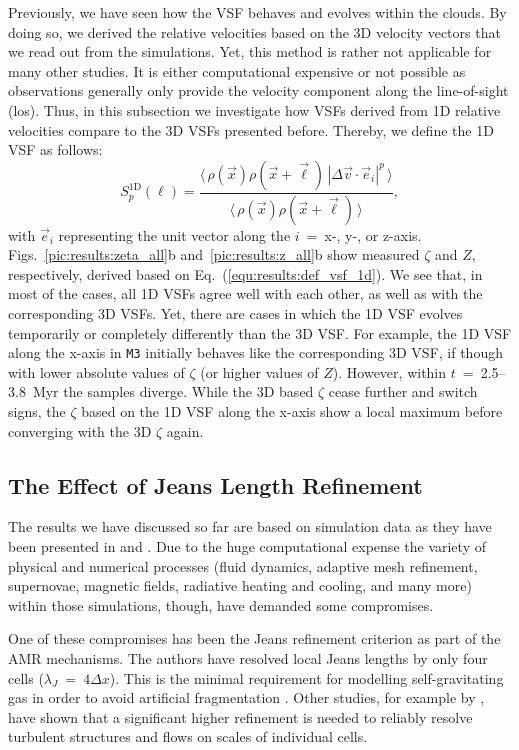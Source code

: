 Previously, we have seen how the VSF behaves and evolves within the clouds.
By doing so, we derived the relative velocities based on the 3D velocity vectors that we read out from the simulations.
Yet, this method is rather not applicable for many other studies. 
It is either computational expensive or not possible as observations generally only provide the velocity component along the line-of-sight (los).
Thus, in this subsection we investigate how VSFs derived from 1D relative velocities compare to the 3D VSFs presented before.
Thereby, we define the 1D VSF as follows:
\begin{equation}
	\mathit{S}_p^\mathrm{1D} (\ell) = \frac{\langle \, \rho(\vec{x}) \rho(\vec{x}+\vec{\ell}) \, |\Delta \vec{v} \cdot \vec{e}_i|^p  \, \rangle}{\langle  \, \rho(\vec{x}) \rho(\vec{x}+\vec{\ell}) \, \rangle} ,
    \label{equ:results:def_vsf_1d}
\end{equation}
with $\vec{e}_i$ representing the unit vector along the $i$~=~x-, y-, or z-axis.
Figs.~\ref{pic:results:zeta_all}b and~\ref{pic:results:z_all}b show measured $\zeta$ and $Z$, respectively, derived based on Eq.~(\ref{equ:results:def_vsf_1d}). 
We see that, in most of the cases, all 1D VSFs agree well with each other, as well as with the corresponding 3D VSFs.
Yet, there are cases in which the 1D VSF evolves temporarily or completely differently than the 3D VSF.
For example, the 1D VSF along the x-axis in \texttt{M3} initially behaves like the corresponding 3D VSF, if though with lower absolute values of $\zeta$ (or higher values of $Z$).
However, within $t$~=~2.5--3.8~Myr the samples diverge. 
While the 3D based $\zeta$ cease further and switch signs, the $\zeta$ based on the 1D VSF along the x-axis show a local maximum before converging with the 3D $\zeta$ again. 


\subsection{The Effect of Jeans Length Refinement}\label{results:refinement}

The results we have discussed so far are based on simulation data as they have been presented in  and .
Due to the huge computational expense the variety of physical and numerical processes (fluid dynamics, adaptive mesh refinement, supernovae, magnetic fields, radiative heating and cooling, and many more) within those simulations, though, have demanded some compromises.

One of these compromises has been the Jeans refinement criterion as part of the AMR mechanisms.
The authors have resolved local Jeans lengths by only four cells ($\lambda_J$~=~$4\Delta{}x$).
This is the minimal requirement for modelling self-gravitating gas in order to avoid artificial fragmentation \citep{Truelove1998}. 
Other studies, for example by \citet{Turk2012}, have shown that a significant higher refinement is needed to reliably resolve turbulent structures and flows on scales of individual cells.

